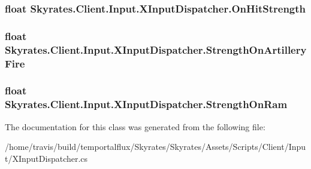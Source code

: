 \hypertarget{class_skyrates_1_1_client_1_1_input_1_1_x_input_dispatcher_a5f7cd1e18bea1cbd99c5df7dd27d4804}{
\subsubsection[{On\-Hit\-Strength}]{\setlength{\rightskip}{0pt plus 5cm}float Skyrates.\-Client.\-Input.\-X\-Input\-Dispatcher.\-On\-Hit\-Strength}}\label{class_skyrates_1_1_client_1_1_input_1_1_x_input_dispatcher_a5f7cd1e18bea1cbd99c5df7dd27d4804}




\hypertarget{class_skyrates_1_1_client_1_1_input_1_1_x_input_dispatcher_af0d461624b8a89d22a04c2221cd1415c}{
\subsubsection[{Strength\-On\-Artillery\-Fire}]{\setlength{\rightskip}{0pt plus 5cm}float Skyrates.\-Client.\-Input.\-X\-Input\-Dispatcher.\-Strength\-On\-Artillery\-Fire}}\label{class_skyrates_1_1_client_1_1_input_1_1_x_input_dispatcher_af0d461624b8a89d22a04c2221cd1415c}




\hypertarget{class_skyrates_1_1_client_1_1_input_1_1_x_input_dispatcher_ab6486f41a0043a925a0ca981d82c9594}{
\subsubsection[{Strength\-On\-Ram}]{\setlength{\rightskip}{0pt plus 5cm}float Skyrates.\-Client.\-Input.\-X\-Input\-Dispatcher.\-Strength\-On\-Ram}}\label{class_skyrates_1_1_client_1_1_input_1_1_x_input_dispatcher_ab6486f41a0043a925a0ca981d82c9594}






The documentation for this class was generated from the following file\-:\begin{DoxyCompactItemize}
\item 
/home/travis/build/temportalflux/\-Skyrates/\-Skyrates/\-Assets/\-Scripts/\-Client/\-Input/X\-Input\-Dispatcher.\-cs\end{DoxyCompactItemize}
